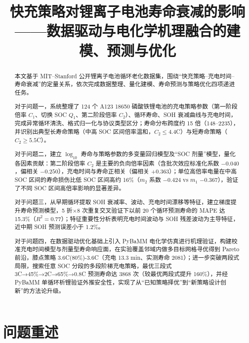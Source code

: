 \documentclass[withoutpreface]{cumcmthesis}
\title{快充策略对锂离子电池寿命衰减的影响\\——数据驱动与电化学机理融合的建模、预测与优化}
\begin{document}
\maketitle

\begin{abstract}
本文基于 MIT--Stanford 公开锂离子电池循环老化数据集，围绕“快充策略--充电时间--寿命衰减”的定量关系，依次完成数据整理、量化建模、寿命预测与策略优化四项递进任务。

对于问题一，系统整理了 124 个 A123 18650 磷酸铁锂电池的充电策略参数（第一阶段倍率 $C_1$、切换 SOC $Q_1$、第二阶段倍率 $C_2$）、循环寿命、SOH 衰减曲线与充电时间，完成异常循环清洗、格式归一化与协议类型区分；寿命分布跨度约 15 倍（148--2235），并识别出典型长寿命策略（中高 SOC 区间倍率温和，$C_2\le 4.4$C）与短寿命策略（$C_2\ge 5.5$C）。

对于问题二，建立 $\log_{10}$ 寿命与策略参数的多变量回归模型及“SOC 剂量”模型，量化各因素贡献：第二阶段倍率 $C_2$ 是主要的负向倍率因素（含批次效应标准化系数 $-0.040$，偏相关 $-0.250$），充电时间与寿命正相关（偏相关 $+0.363$）；单位高倍率电量在中高 SOC 区间的寿命损伤比低 SOC 区间高约 16\%（$m_2$ 系数 $-0.424$ vs $m_1$ $-0.367$），验证了不同 SOC 区间高倍率影响的显著差异。

对于问题三，从早期循环提取 SOH 衰减率、波动、充电时间漂移等特征，建立梯度提升寿命预测模型，5 折$\times$8 次重复交叉验证下以前 20 个循环预测寿命的 MAPE 达 15.3\%（$R^2=0.77$）；特征重要性分析表明充电时间波动与 SOH 残差波动为主导特征，近中期 SOH 预测误差小于 1.2\%。

对于问题四，在数据驱动优化基础上引入 PyBaMM 电化学仿真进行机理验证，构建校准充电时间模型与剂量型寿命响应面，在实验覆盖邻域内做多目标网格寻优得到 Pareto 前沿，膝点策略 3.6C(80\%)-3.6C（充电 13.3 min、实测寿命 2081）；进一步突破两段式局限，搜索任意 SOC 分段的多段阶梯充电策略，最优三段式 3C→45\%→2C→65\%→0.8C 预测寿命达 3868 次（较最优两段式提升 160\%），并经 PyBaMM 单循环析锂验证外推安全性，实现了从“已知策略择优”到“新策略设计创新”的方法论升级。

\end{abstract}

\section{问题重述}
\end{document}
